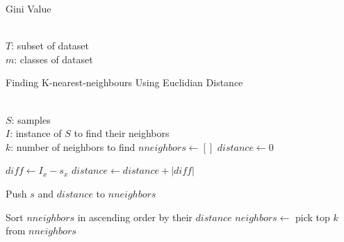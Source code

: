 \documentclass[english]{beamer}
\begin{document}
\begin{frame}
	{Gini Value}
	\begin{algorithmic}[1]
		\Require \\
		$ T $: subset of dataset \\
		$ m $: classes of dataset
			\State {}
		\EndFunction
	\end{algorithmic}
\end{frame}

\begin{frame}
	{Finding K-nearest-neighbours}
	{Using Euclidian Distance}
	\footnotesize
	\begin{algorithmic}[1]
		\Require \\
		$ S $: samples \\
		$ I $: instance of $S$ to find their neighbors \\
		$ k $: number of neighbors to find
			\State $ nneighbors \gets [] $
				\State $ distance \gets 0 $

					\State $ diff \gets I_{x} - s_{x} $
					\State $ distance \gets distance + |diff| $
				\EndFor

				\State Push $s$ and $distance$ to $nneighbors$
			\EndFor

			\State Sort $nneighbors$ in ascending order by their $distance$
			\State $neighbors \gets $ pick top $k$ from $nneighbors$
			\State {}
		\EndFunction
	\end{algorithmic}
\end{frame}
\end{document}
